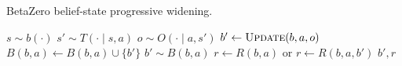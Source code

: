 \begin{algorithm}[H]
    \small
    \caption{BetaZero belief-state progressive widening.}
    \label{alg:betazero-state-pw}
    \begin{algorithmic}[1]
                \State $s \sim b(\cdot)$
                \State $s' \sim T(\cdot \mid s, a)$
                \State $o \sim O(\cdot \mid a, s')$
                \hspace*{4em}%
                \State $b' \leftarrow \textsc{Update}(b,a,o)$
                \State $B(b,a) \leftarrow B(b,a) \cup \{b'\}$ 
            \Else
                \State $b' \sim B(b,a)$ 
            \EndIf
            \State $r \leftarrow R(b, a)$ or $r \leftarrow R(b, a, b')$
            \State \Return $b', r$
        \EndFunction
    \end{algorithmic}
\end{algorithm}